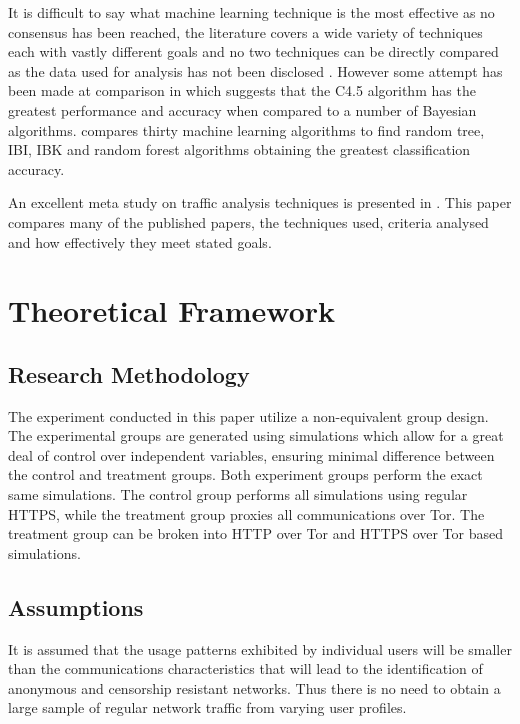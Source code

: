 \documentclass{ecuthesis}
\begin{document}
It is difficult to say what machine learning technique is the most effective as
no consensus has been reached, the literature covers a wide variety of
techniques each with vastly different goals and no two techniques can be
directly compared as the data used for analysis has not been disclosed
\parencite{Kim:2007p3867}. However some attempt has been made at comparison in
\textcite{Williams:2006p3849} which suggests that the C4.5 algorithm has the
greatest performance and accuracy when compared to a number of Bayesian
algorithms. \textcite{Mohd:2009p6484} compares thirty machine learning
algorithms  to find random tree, IBI, IBK and random forest algorithms
obtaining the greatest classification accuracy.

An excellent meta study on traffic analysis techniques is presented in
\textcite{Nguyen:2008p3837}. This paper compares many of the published papers,
the techniques used, criteria analysed and how effectively they meet stated
goals.

\chapter{Theoretical Framework}

\section{Research Methodology}

The experiment conducted in this paper utilize a non-equivalent group design.
The experimental groups are generated using simulations which allow for a great
deal of control over independent variables, ensuring minimal difference between
the control and treatment groups. Both experiment groups perform the exact same
simulations. The control group performs all simulations using regular HTTPS,
while the treatment group proxies all communications over Tor. The treatment
group can be broken into HTTP over Tor and HTTPS over Tor based simulations.

\section{Assumptions}

It is assumed that the usage patterns exhibited by individual users will be
smaller than the communications characteristics that will lead to the
identification of anonymous and censorship resistant networks. Thus there is no
need to obtain a large sample of regular network traffic from varying user
profiles.
\end{document}
